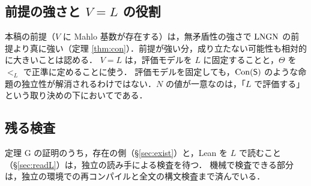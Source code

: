 \subsection{前提の強さと $V{=}L$ の役割}
本稿の前提（$V$ に Mahlo 基数が存在する）は，無矛盾性の強さで $\mathrm{LNGN}$ の前提より真に強い（定理 \ref{thm:con}）．前提が強い分，成り立たない可能性も相対的に大きいことは認める．
$V{=}L$ は，評価モデルを $L$ に固定することと，$\Theta$ を $<_L$ で正準に定めることに使う．
評価モデルを固定しても，$\mathrm{Con}(\mathsf{S})$ のような命題の独立性が解消されるわけではない．$N$ の値が一意なのは，「$L$ で評価する」という取り決めの下においてである．

\subsection{残る検査}
定理 G の証明のうち，存在の側（\S\ref{sec:exist}）と，Lean を $L$ で読むこと（\S\ref{sec:readL}）は，独立の読み手による検査を待つ．
機械で検査できる部分は，独立の環境での再コンパイルと全文の構文検査まで済んでいる．
